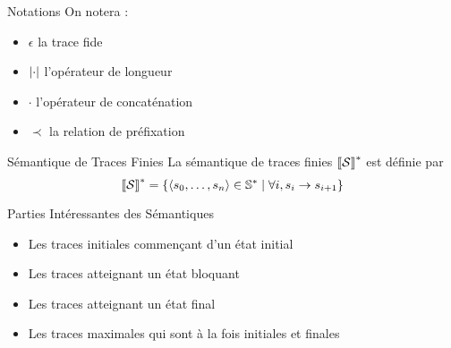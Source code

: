 \documentclass{cours}
\begin{document}
\begin{définition}{Notations}{}
    On notera :
    \begin{itemize}
        \item $\epsilon$ la trace fide
        \item $\left|\cdot\right|$ l'opérateur de longueur
        \item $\cdot$ l'opérateur de concaténation
        \item $\prec$ la relation de préfixation
    \end{itemize}
\end{définition}

\begin{définition}{Sémantique de Traces Finies}{}
    La sémantique de traces finies $\left\llbracket \mathcal{S} \right\rrbracket^{*}$ est définie par 
    \[
        \left\llbracket \mathcal{S} \right\rrbracket^{*} = \left\{\left\langle s_{0}, \ldots, s_{n} \right\rangle \in \mathbb{S}^{*} \mid \forall i, s_{i} \rightarrow s_{i + 1}\right\}
    \]
\end{définition}

\begin{définition}{Parties Intéressantes des Sémantiques}{}
    \begin{itemize}
        \item Les traces initiales commençant d'un état initial
        \item Les traces atteignant un état bloquant
        \item Les traces atteignant un état final 
        \item Les traces maximales qui sont à la fois initiales et finales
    \end{itemize}
\end{définition}
\end{document}
